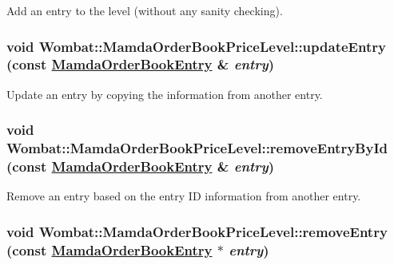 Add an entry to the level (without any sanity checking). 

\hypertarget{classWombat_1_1MamdaOrderBookPriceLevel_90e46840d812ec88a9f2f787f1b39ac4}{
\subsubsection[updateEntry]{\setlength{\rightskip}{0pt plus 5cm}void Wombat::Mamda\-Order\-Book\-Price\-Level::update\-Entry (const \hyperlink{classWombat_1_1MamdaOrderBookEntry}{Mamda\-Order\-Book\-Entry} \& {\em entry})}}
\label{classWombat_1_1MamdaOrderBookPriceLevel_90e46840d812ec88a9f2f787f1b39ac4}


Update an entry by copying the information from another entry. 

\hypertarget{classWombat_1_1MamdaOrderBookPriceLevel_d1d7856abe96bc4117b9ca747eb874ef}{
\subsubsection[removeEntryById]{\setlength{\rightskip}{0pt plus 5cm}void Wombat::Mamda\-Order\-Book\-Price\-Level::remove\-Entry\-By\-Id (const \hyperlink{classWombat_1_1MamdaOrderBookEntry}{Mamda\-Order\-Book\-Entry} \& {\em entry})}}
\label{classWombat_1_1MamdaOrderBookPriceLevel_d1d7856abe96bc4117b9ca747eb874ef}


Remove an entry based on the entry ID information from another entry. 

\hypertarget{classWombat_1_1MamdaOrderBookPriceLevel_60064fdfb428a31859a01b1e33ad820f}{
\subsubsection[removeEntry]{\setlength{\rightskip}{0pt plus 5cm}void Wombat::Mamda\-Order\-Book\-Price\-Level::remove\-Entry (const \hyperlink{classWombat_1_1MamdaOrderBookEntry}{Mamda\-Order\-Book\-Entry} $\ast$ {\em entry})}}
\label{classWombat_1_1MamdaOrderBookPriceLevel_60064fdfb428a31859a01b1e33ad820f}



